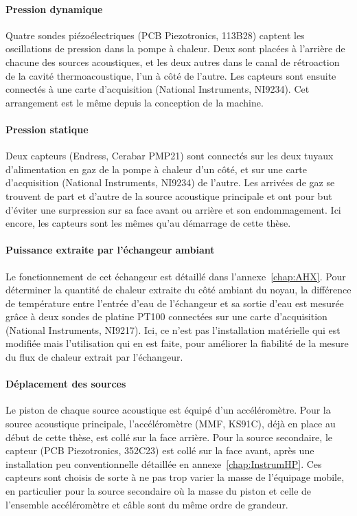\paragraph{Pression dynamique} Quatre sondes piézoélectriques (PCB Piezotronics, 113B28) captent les oscillations de pression dans la pompe à chaleur. Deux sont placées à l'arrière de chacune des sources acoustiques, et les deux autres dans le canal de rétroaction de la cavité thermoacoustique, l'un à côté de l'autre. Les capteurs sont ensuite connectés à une carte d'acquisition (National Instruments, NI9234). Cet arrangement est le même depuis la conception de la machine.

\paragraph{Pression statique} Deux capteurs (Endress, Cerabar PMP21) sont connectés sur les deux tuyaux d'alimentation en gaz de la pompe  à chaleur d'un côté, et sur une carte d'acquisition (National Instruments, NI9234) de l'autre. Les arrivées de gaz se trouvent de part et d'autre de la source acoustique principale et ont pour but d'éviter une surpression sur sa face avant ou arrière et son endommagement. Ici encore, les capteurs sont les mêmes qu'au démarrage de cette thèse.

\paragraph{Puissance extraite par l'échangeur ambiant} Le fonctionnement de cet échangeur est détaillé dans l'annexe~\ref{chap:AHX}. Pour déterminer la quantité de chaleur extraite du côté ambiant du noyau, la différence de température entre l'entrée d'eau de l'échangeur et sa sortie d'eau est mesurée grâce à deux sondes de platine PT100 connectées sur une carte d'acquisition (National Instruments, NI9217). Ici, ce n'est pas l'installation matérielle qui est modifiée mais l'utilisation qui en est faite, pour améliorer la fiabilité de la mesure du flux de chaleur extrait par l'échangeur.

\paragraph{Déplacement des sources} Le piston de chaque source acoustique est équipé d'un accéléromètre. Pour la source acoustique principale, l'accéléromètre (MMF, KS91C), déjà en place au début de cette thèse, est collé sur la face arrière. Pour la source secondaire, le capteur (PCB Piezotronics, 352C23) est collé sur la face avant, après une installation peu conventionnelle détaillée en annexe~\ref{chap:InstrumHP}. Ces capteurs sont choisis de sorte à ne pas trop varier la masse de l'équipage mobile, en particulier pour la source secondaire où la masse du piston et celle de l'ensemble accéléromètre et câble sont du même ordre de grandeur.

